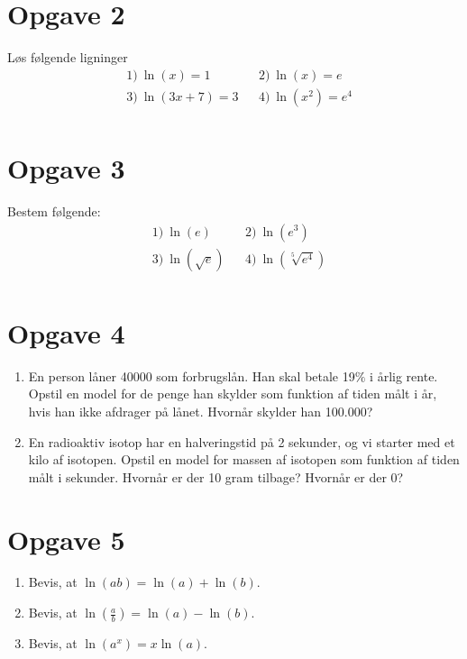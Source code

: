 \section*{Opgave 2}
Løs følgende ligninger
\begin{align*}
&1) \ \ln(x)=1   &&2) \ \ln(x)=e    \\
&3) \ \ln(3x+7) = 3   &&4) \  \ln(x^2) = e^4   \\
\end{align*}
\section*{Opgave 3}
Bestem følgende:
\begin{align*}
&1) \  \ln(e)  &&2) \  \ln(e^3)    \\
&3) \  \ln(\sqrt{e})  &&4) \ \ln(\sqrt[5]{e^4})      \\
\end{align*}

\section*{Opgave 4}
\begin{enumerate}[label=\roman*)]
\item En person låner 40000 som forbrugslån. Han skal betale 19$\%$ i årlig rente. Opstil en model for de penge han skylder som funktion af tiden målt i år, hvis han ikke afdrager på lånet. Hvornår skylder han 100.000?
\item En radioaktiv isotop har en halveringstid på 2 sekunder, og vi starter med et kilo af isotopen. Opstil en model for massen af isotopen som funktion af tiden målt i sekunder. Hvornår er der 10 gram tilbage? Hvornår er der 0?
\end{enumerate}
\section*{Opgave 5}
\begin{enumerate}[label=\roman*)]
\item Bevis, at  $\ln(ab) = \ln(a)+\ln(b).$
\item Bevis, at  $\ln(\frac{a}{b}) = \ln(a)-\ln(b)$.
\item Bevis, at  $\ln(a^x) = x\ln(a)$.
\end{enumerate}

